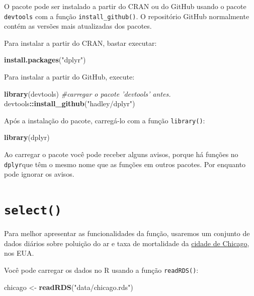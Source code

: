 \documentclass[]{book}
\newenvironment{Shaded}{\begin{snugshade}}{\end{snugshade}}
\newcommand{\CommentTok}[1]{\textcolor[rgb]{0.56,0.35,0.01}{\textit{#1}}}
\newcommand{\KeywordTok}[1]{\textcolor[rgb]{0.13,0.29,0.53}{\textbf{#1}}}
\newcommand{\NormalTok}[1]{#1}
\newcommand{\OperatorTok}[1]{\textcolor[rgb]{0.81,0.36,0.00}{\textbf{#1}}}
\newcommand{\StringTok}[1]{\textcolor[rgb]{0.31,0.60,0.02}{#1}}
\begin{document}
O pacote pode ser instalado a partir do CRAN ou do GitHub usando o pacote \texttt{devtools} com a função \texttt{install\_github()}. O repositório GitHub normalmente contém as versões mais atualizadas dos pacotes.

Para instalar a partir do CRAN, bastar executar:

\begin{Shaded}
\begin{Highlighting}[]
\KeywordTok{install.packages}\NormalTok{(}\StringTok{"dplyr"}\NormalTok{)}
\end{Highlighting}
\end{Shaded}

Para instalar a partir do GitHub, execute:

\begin{Shaded}
\begin{Highlighting}[]
\KeywordTok{library}\NormalTok{(devtools) }\CommentTok{#carregar o pacote 'devtools' antes.}
\NormalTok{devtools}\OperatorTok{::}\KeywordTok{install_github}\NormalTok{(}\StringTok{"hadley/dplyr"}\NormalTok{)}
\end{Highlighting}
\end{Shaded}

Após a instalação do pacote, carregá-lo com a função \texttt{library()}:

\begin{Shaded}
\begin{Highlighting}[]
\KeywordTok{library}\NormalTok{(dplyr)}
\end{Highlighting}
\end{Shaded}

Ao carregar o pacote você pode receber alguns avisos, porque há funções no \texttt{dplyr}que têm o mesmo nome que as funções em outros pacotes. Por enquanto pode ignorar os avisos.

\hypertarget{select}{%
\section{\texorpdfstring{\texttt{select()}}{select()}}\label{select}}

Para melhor apresentar as funcionalidades da função, usaremos um conjunto de dados diários sobre poluição do ar e taxa de mortalidade da \href{http://www.biostat.jhsph.edu/~rpeng/leanpub/rprog/chicago_data.zip}{cidade de Chicago}, nos EUA.

Você pode carregar os dados no R usando a função \texttt{readRDS()}:

\begin{Shaded}
\begin{Highlighting}[]
\NormalTok{chicago <-}\StringTok{ }\KeywordTok{readRDS}\NormalTok{(}\StringTok{"data/chicago.rds"}\NormalTok{)}
\end{Highlighting}
\end{Shaded}
\end{document}
